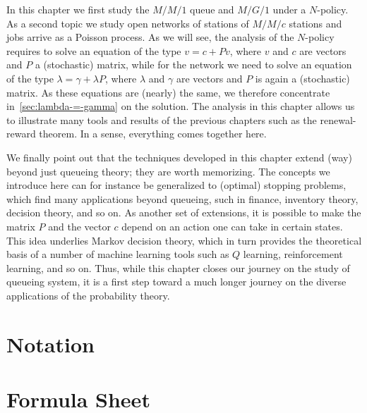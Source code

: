 In this chapter we first study the $M/M/1$ queue and $M/G/1$ under a $N$-policy.
As a second topic we study open networks of stations of $M/M/c$ stations and jobs arrive as a Poisson process.
As we will see, the analysis of the $N$-policy requires to solve an equation of the type $v = c + P v$, where $v$ and $c$ are vectors and $P$ a (stochastic) matrix, while for the network we need to solve an equation of the type $\lambda = \gamma + \lambda P$, where $\lambda$ and $\gamma$ are vectors and $P$ is again a (stochastic) matrix.
As these equations are (nearly) the same, we therefore concentrate in~\cref{sec:lambda-=-gamma} on the solution.
The analysis in this chapter allows us to illustrate many tools and results of the previous chapters such as the renewal-reward theorem.
In a sense, everything comes together here.

We finally point out that the techniques developed in this chapter extend (way) beyond just queueing theory; they are worth memorizing.
The concepts we introduce here can for instance be generalized to (optimal) stopping problems, which find many applications beyond queueing, such in finance, inventory theory, decision theory, and so on.
As another set of extensions, it is possible to make the matrix $P$ and the vector $c$ depend on an action one can take in certain states.
This idea underlies Markov decision theory, which in turn provides the theoretical basis of a number of machine learning tools such as $Q$ learning, reinforcement learning, and so on.
Thus, while this chapter closes our journey on the study of queueing system, it is a first step toward a much longer journey on the diverse applications of the probability theory. 









%
%
%
%
%
%



\backmatter





\chapter{Notation}
\label{sec:notation}


\chapter{Formula Sheet}


\printindex

